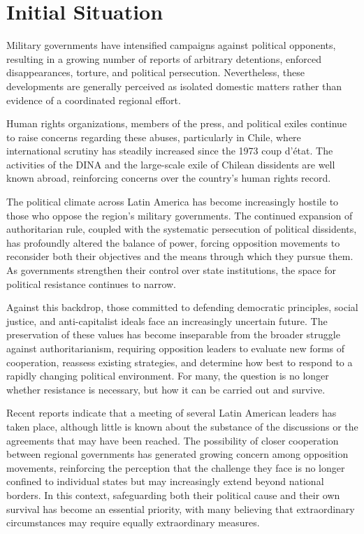 \section{Initial Situation}


Military governments have intensified campaigns against political opponents, resulting in a growing number of reports of arbitrary detentions, enforced disappearances, torture, and political persecution. Nevertheless, these developments are generally perceived as isolated domestic matters rather than evidence of a coordinated regional effort.

Human rights organizations, members of the press, and political exiles continue to raise concerns regarding these abuses, particularly in Chile, where international scrutiny has steadily increased since the 1973 coup d’état. The activities of the DINA and the large-scale exile of Chilean dissidents are well known abroad, reinforcing concerns over the country’s human rights record.

The political climate across Latin America has become increasingly hostile to those who oppose the region's military governments. The continued expansion of authoritarian rule, coupled with the systematic persecution of political dissidents, has profoundly altered the balance of power, forcing opposition movements to reconsider both their objectives and the means through which they pursue them. As governments strengthen their control over state institutions, the space for political resistance continues to narrow.

Against this backdrop, those committed to defending democratic principles, social justice, and anti-capitalist ideals face an increasingly uncertain future. The preservation of these values has become inseparable from the broader struggle against authoritarianism, requiring opposition leaders to evaluate new forms of cooperation, reassess existing strategies, and determine how best to respond to a rapidly changing political environment. For many, the question is no longer whether resistance is necessary, but how it can be carried out and survive.

Recent reports indicate that a meeting of several Latin American leaders has taken place, although little is known about the substance of the discussions or the agreements that may have been reached. The possibility of closer cooperation between regional governments has generated growing concern among opposition movements, reinforcing the perception that the challenge they face is no longer confined to individual states but may increasingly extend beyond national borders. In this context, safeguarding both their political cause and their own survival has become an essential priority, with many believing that extraordinary circumstances may require equally extraordinary measures.
